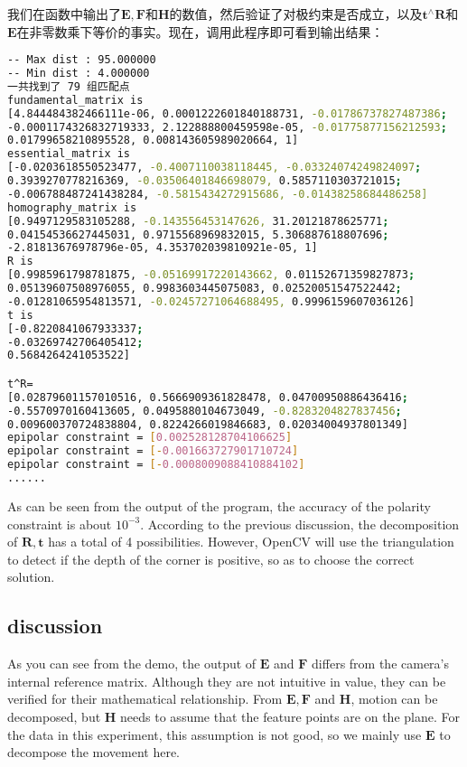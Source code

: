 我们在函数中输出了$\bm{E}, \bm{F}$和$\bm{H}$的数值，然后验证了对极约束是否成立，以及$\bm{t}^\wedge \bm{R}$和$\bm{E}$在非零数乘下等价的事实。现在，调用此程序即可看到输出结果：
\begin{lstlisting}[language=sh,caption=终端输入：]
% build/pose_estimation_2d2d 1.png 2.png
-- Max dist : 95.000000 
-- Min dist : 4.000000 
一共找到了 79 组匹配点
fundamental_matrix is 
[4.844484382466111e-06, 0.0001222601840188731, -0.01786737827487386;
-0.0001174326832719333, 2.122888800459598e-05, -0.01775877156212593;
0.01799658210895528, 0.008143605989020664, 1]
essential_matrix is 
[-0.0203618550523477, -0.4007110038118445, -0.03324074249824097;
0.3939270778216369, -0.03506401846698079, 0.5857110303721015;
-0.006788487241438284, -0.5815434272915686, -0.01438258684486258]
homography_matrix is 
[0.9497129583105288, -0.143556453147626, 31.20121878625771;
0.04154536627445031, 0.9715568969832015, 5.306887618807696;
-2.81813676978796e-05, 4.353702039810921e-05, 1]
R is 
[0.9985961798781875, -0.05169917220143662, 0.01152671359827873;
0.05139607508976055, 0.9983603445075083, 0.02520051547522442;
-0.01281065954813571, -0.02457271064688495, 0.9996159607036126]
t is 
[-0.8220841067933337;
-0.03269742706405412;
0.5684264241053522]

t^R=
[0.02879601157010516, 0.5666909361828478, 0.04700950886436416;
-0.5570970160413605, 0.0495880104673049, -0.8283204827837456;
0.009600370724838804, 0.8224266019846683, 0.02034004937801349]
epipolar constraint = [0.002528128704106625]
epipolar constraint = [-0.001663727901710724]
epipolar constraint = [-0.0008009088410884102]
......
\end{lstlisting}

As can be seen from the output of the program, the accuracy of the polarity constraint is about $10^{-3}$. According to the previous discussion, the decomposition of $\bm{R}, \bm{t}$ has a total of 4 possibilities. However, OpenCV will use the triangulation to detect if the depth of the corner is positive, so as to choose the correct solution.

\subsection*{discussion}
As you can see from the demo, the output of $\bm{E}$ and $\bm{F}$ differs from the camera's internal reference matrix. Although they are not intuitive in value, they can be verified for their mathematical relationship. From $\bm{E}, \bm{F}$ and $\bm{H}$, motion can be decomposed, but $\bm{H}$ needs to assume that the feature points are on the plane. For the data in this experiment, this assumption is not good, so we mainly use $\bm{E}$ to decompose the movement here.

